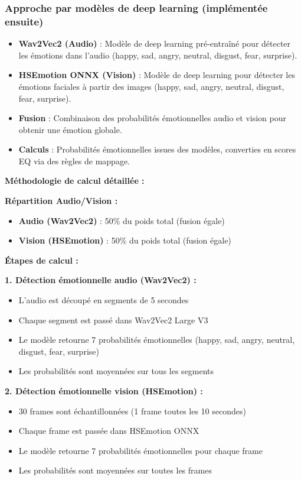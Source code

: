 \documentclass[12pt,a4paper]{article}
\begin{document}
\subsubsection{Approche par modèles de deep learning (implémentée ensuite)}
\begin{itemize}
    \item \textbf{Wav2Vec2 (Audio)} : Modèle de deep learning pré-entraîné pour détecter les émotions dans l'audio (happy, sad, angry, neutral, disgust, fear, surprise).
    \item \textbf{HSEmotion ONNX (Vision)} : Modèle de deep learning pour détecter les émotions faciales à partir des images (happy, sad, angry, neutral, disgust, fear, surprise).
    \item \textbf{Fusion} : Combinaison des probabilités émotionnelles audio et vision pour obtenir une émotion globale.
    \item \textbf{Calculs} : Probabilités émotionnelles issues des modèles, converties en scores EQ via des règles de mappage.
\end{itemize}

\textbf{Méthodologie de calcul détaillée :}

\textbf{Répartition Audio/Vision :}
\begin{itemize}
    \item \textbf{Audio (Wav2Vec2)} : 50\% du poids total (fusion égale)
    \item \textbf{Vision (HSEmotion)} : 50\% du poids total (fusion égale)
\end{itemize}

\textbf{Étapes de calcul :}

\textbf{1. Détection émotionnelle audio (Wav2Vec2) :}
\begin{itemize}
    \item L'audio est découpé en segments de 5 secondes
    \item Chaque segment est passé dans Wav2Vec2 Large V3
    \item Le modèle retourne 7 probabilités émotionnelles (happy, sad, angry, neutral, disgust, fear, surprise)
    \item Les probabilités sont moyennées sur tous les segments
\end{itemize}

\textbf{2. Détection émotionnelle vision (HSEmotion) :}
\begin{itemize}
    \item 30 frames sont échantillonnées (1 frame toutes les 10 secondes)
    \item Chaque frame est passée dans HSEmotion ONNX
    \item Le modèle retourne 7 probabilités émotionnelles pour chaque frame
    \item Les probabilités sont moyennées sur toutes les frames
\end{itemize}
\end{document}
